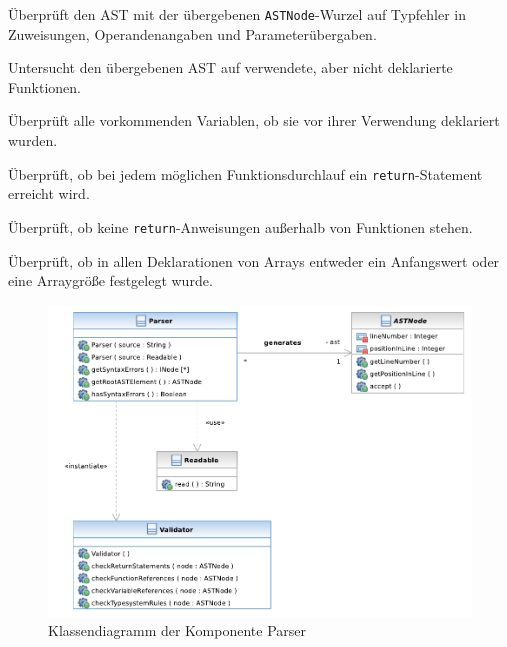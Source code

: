 \begin{description}
    Überprüft den AST mit der übergebenen \texttt{ASTNode}-Wurzel auf Typfehler in Zuweisungen, Operandenangaben und Parameterübergaben.

    Untersucht den übergebenen AST auf verwendete, aber nicht deklarierte Funktionen.

    Überprüft alle vorkommenden Variablen, ob sie vor ihrer Verwendung deklariert wurden.

    Überprüft, ob bei jedem möglichen Funktionsdurchlauf ein \texttt{return}-Statement erreicht wird.
    
    Überprüft, ob keine \texttt{return}-Anweisungen außerhalb von Funktionen stehen.
    
    Überprüft, ob in allen Deklarationen von Arrays entweder ein Anfangswert oder eine Arraygröße festgelegt wurde.
\end{description}

\begin{figure}%
    \includegraphics[width=\textwidth]{diagrams/parser_component.pdf}

    \caption{Klassendiagramm der Komponente Parser}
\end{figure}%
